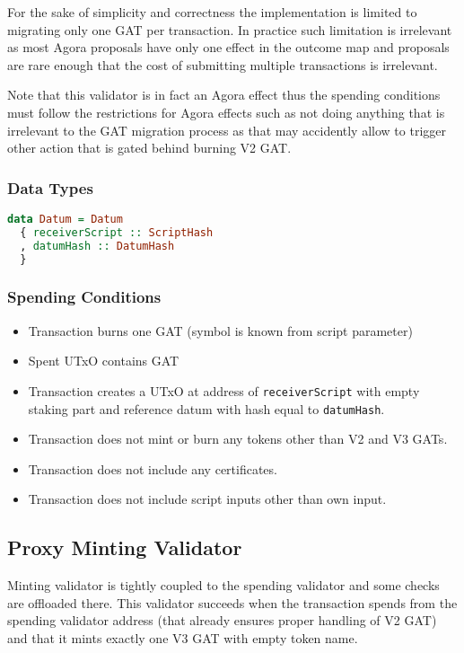 \documentclass{article}
\begin{document}
For the sake of simplicity and correctness the implementation is limited to migrating only one GAT per transaction.
In practice such limitation is irrelevant as most Agora proposals have only one effect in the outcome map and proposals are rare enough that the cost of submitting multiple transactions is irrelevant.

Note that this validator is in fact an Agora effect thus the spending conditions must follow the restrictions for Agora effects such as not doing anything that is irrelevant to the GAT migration process as that may accidently allow to trigger other action that is gated behind burning V2 GAT.

\subsubsection*{Data Types}

\begin{lstlisting}[language=Haskell]
data Datum = Datum
  { receiverScript :: ScriptHash
  , datumHash :: DatumHash
  }
\end{lstlisting}

\subsubsection*{Spending Conditions}

\begin{itemize}
  \item Transaction burns one GAT (symbol is known from script parameter)
  \item Spent UTxO contains GAT
  \item Transaction creates a UTxO at address of \verb|receiverScript| with empty staking part and reference datum with hash equal to \verb|datumHash|.
  \item Transaction does not mint or burn any tokens other than V2 and V3 GATs.
  \item Transaction does not include any certificates.
  \item Transaction does not include script inputs other than own input.
\end{itemize}

\subsection{Proxy Minting Validator}

Minting validator is tightly coupled to the spending validator and some checks are offloaded there. This validator succeeds when the transaction spends from the spending validator address (that already ensures proper handling of V2 GAT) and that it mints exactly one V3 GAT with empty token name.
\end{document}
